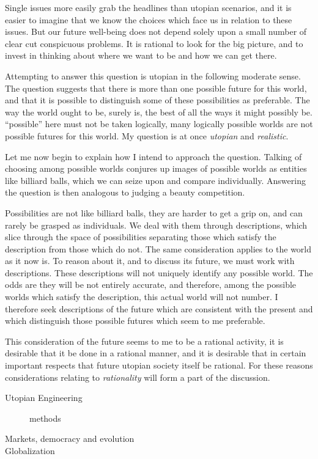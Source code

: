 Single issues more easily grab the headlines than utopian scenarios, and it is easier to imagine that we know the choices which face us in relation to these issues.
But our future well-being does not depend solely upon a small number of clear cut conspicuous problems.
It is rational to look for the big picture, and to invest in thinking about where we want to be and how we can get there.

Attempting to answer this question is utopian in the following moderate sense.
The question suggests that there is more than one possible future for this world, and that it is possible to distinguish some of these possibilities as preferable.
The way the world ought to be, surely is, the best of all the ways it might possibly be.
``possible'' here must not be taken logically, many logically possible worlds are not possible futures for this world.
My question is at once {\it utopian} and {\it realistic}.

Let me now begin to explain how I intend to approach the question.
Talking of choosing among possible worlds conjures up images of possible worlds as entities like billiard balls, which we can seize upon and compare individually.
Answering the question is then analogous to judging a beauty competition.

Possibilities are not like billiard balls, they are harder to get a grip on, and can rarely be grasped as individuals.
We deal with them through descriptions, which slice through the space of possibilities separating those which satisfy the description from those which do not.
The same consideration applies to the world as it now is.
To reason about it, and to discuss its future, we must work with descriptions.
These descriptions will not uniquely identify any possible world.
The odds are they will be not entirely accurate, and therefore, among the possible worlds which satisfy the description, this actual world will not number.
I therefore seek descriptions of the future which are consistent with the present and which distinguish those possible futures which seem to me preferable.

This consideration of the future seems to me to be a rational activity, it is desirable that it be done in a rational manner, and it is desirable that in certain important respects that future utopian society itself be rational.
For these reasons considerations relating to {\it rationality} will form a part of the discussion.

\begin{description}
\item[Utopian Engineering] methods
\item[Markets, democracy and evolution]
\item[Globalization]
\end{description}

